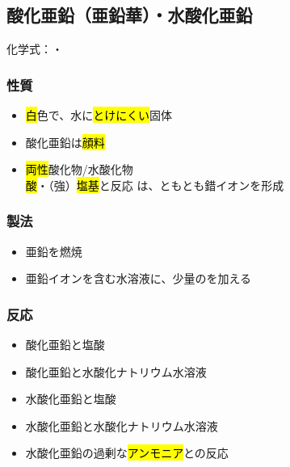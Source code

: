  \subsection{酸化亜鉛（亜鉛華）・水酸化亜鉛}
 化学式：\hl{}・\hl{}
 \subsubsection{性質}
 \begin{itemize}
  \item \hl{白}色で、水に\hl{とけにくい}固体
  \item 酸化亜鉛は\hl{顔料}
  \item \hl{両性}酸化物/水酸化物\\
  \hl{酸}・（強）\hl{塩基}と反応
  は、\hl{}とも\hl{}とも錯イオンを形成
 \end{itemize}
 \subsubsection{製法}
 \begin{itemize}
  \item 亜鉛を燃焼 \K {}\\
  \item 亜鉛イオンを含む水溶液に、少量の\hl{}を加える \\
 \end{itemize}
 \subsubsection{反応}
 \begin{itemize}
  \item 酸化亜鉛と塩酸\\
  \item 酸化亜鉛と水酸化ナトリウム水溶液\\
  \item 水酸化亜鉛と塩酸\\
  \item 水酸化亜鉛と水酸化ナトリウム水溶液\\
  \item 水酸化亜鉛の過剰な\hl{アンモニア}との反応\\
 \end{itemize}
